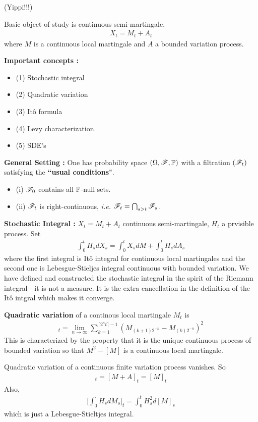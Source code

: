\documentclass[12pt,a4paper]{article}
\renewenvironment{i}
{\begin{itemize} 
	}%
	{\end{itemize}
}
\begin{document}
(Yippi!!!)

Basic object of study is continuous semi-martingale,
\begin{align*}
X_t = M_t + A_t
\end{align*}
where $M$ is a continuous local martingale and $A$ a bounded variation process.
\s

\textbf{Important concepts :}
\begin{i}
\item[(1)] Stochastic integral
\item[(2)] Quadratic variation
\item[(3)] It\^o formula
\item[(4)] Levy characterization.
\item[(5)] SDE's
\end{i} 
\s

\textbf{General Setting :} One has probability space $(\Omega, \mathscr{F}, \mathbb{P})$ with a filtration $(\mathscr{F}_t)$ satisfying the \textbf{``usual conditions"}.
\begin{i}
\item[(i)] $\mathscr{F}_0$ contains all $\mathbb{P}$-null sets.
\item[(ii)] $\mathscr{F}_t$ is right-continuous, \textit{i.e.} $\mathscr{F}_t =\bigcap_{s>t} \mathscr{F}_s$.
\end{i}
\s

\textbf{Stochastic Integral :} $X_t = M_t + A_t$ continuous semi-martingale, $H_t$ a prvisible process. Set 
\begin{align*}
\int_0^t H_s dX_s = \int_0^t X_s dM + \int_0^t H_s dA_s
\end{align*}
where the first integral is It\^o integral for continuous local martingales and the second one is Lebesgue-Stieljes integral continuous with bounded variation. We have defined and constructed the stochastic integral in the spirit of the Riemann integral - it is not a measure. It is the extra cancellation in the definition of the It\^o intgral which makes it converge.
\s

\textbf{Quadratic variation} of a continous local martingale $M_t$ is
\begin{align*}
[M]_t = \lim_{n\rightarrow \infty} \sum_{k=1}^{\lceil 2^nt \rceil -1} (M_{(k+1)2^{-n}} -M_{(k)2^{-n}})^2
\end{align*}
This is characterized by the property that it is the unique continuous process of bounded variation so that $M^2 - [M]$ is a continuous local martingale. 

\quad Quadratic variation of a continuous finite variation process vanishes. So
\begin{align*}
[X]_t = [M+A]_t = [M]_t
\end{align*}
Also,
\begin{align*}
\Big[ \int_0^{\cdot} H_s dM_s \Big]_t = \int_0^t H_s^2 d[M]_s
\end{align*}
which is just a Lebesgue-Stieltjes integral. 
\s
\end{document}
